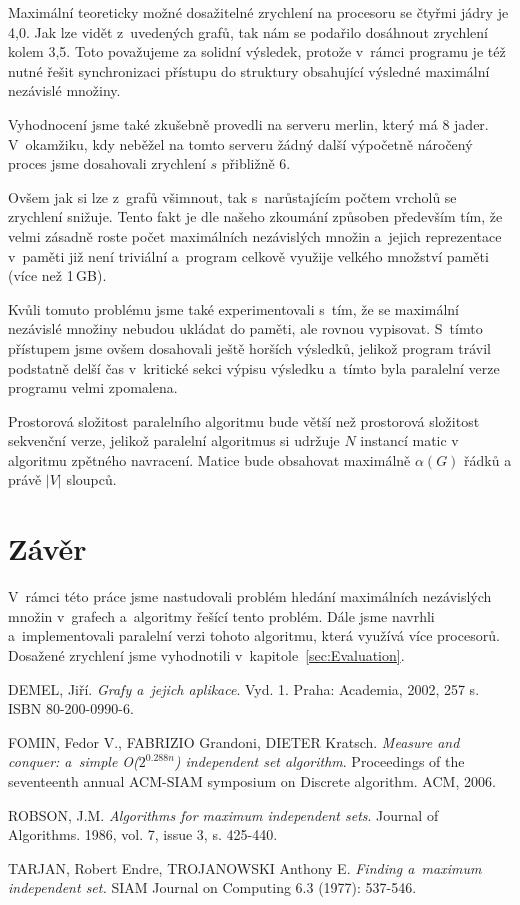 \documentclass[12pt]{article}
\begin{document}
Maximální teoreticky možné dosažitelné zrychlení na procesoru se čtyřmi jádry je 4,0. Jak lze vidět z~uvedených grafů, tak nám se podařilo dosáhnout zrychlení kolem 3,5. Toto považujeme za solidní výsledek, protože v~rámci programu je též nutné řešit synchronizaci přístupu do struktury obsahující výsledné maximální nezávislé množiny.

Vyhodnocení jsme také zkušebně provedli na serveru merlin, který má 8 jader. V~okamžiku, kdy neběžel na tomto serveru žádný další výpočetně náročený proces jsme dosahovali zrychlení $s$ přibližně 6.  

Ovšem jak si lze z~grafů všimnout, tak s~narůstajícím počtem vrcholů se zrychlení snižuje. Tento fakt je dle našeho zkoumání způsoben především tím, že velmi zásadně roste počet maximálních nezávislých množin a~jejich reprezentace v~paměti již není triviální a~program celkově využije velkého množství paměti (více než 1\,GB). 

Kvůli tomuto problému jsme také experimentovali s~tím, že se maximální nezávislé množiny nebudou ukládat do paměti, ale rovnou vypisovat. S~tímto přístupem jsme ovšem dosahovali ještě horších výsledků, jelikož program trávil podstatně delší čas v~kritické sekci výpisu výsledku a~tímto byla paralelní verze programu velmi zpomalena. 

Prostorová složitost paralelního algoritmu bude větší než prostorová složitost sekvenční verze, jelikož paralelní algoritmus si udržuje $N$ instancí matic v algoritmu zpětného navracení. Matice bude obsahovat maximálně $\alpha(G)$ řádků a právě $|V|$ sloupců.

\section{Závěr}
V~rámci této práce jsme nastudovali problém hledání maximálních nezávislých množin v~grafech a~algoritmy řešící tento problém. Dále jsme navrhli a~implementovali paralelní verzi tohoto algoritmu, která využívá více procesorů. Dosažené zrychlení jsme vyhodnotili v~kapitole~\ref{sec:Evaluation}.


\begin{thebibliography}{99}

    DEMEL, Jiří. \emph{Grafy a~jejich aplikace}. Vyd. 1. Praha: Academia, 2002, 257 s. ISBN 80-200-0990-6.

  FOMIN, Fedor V., FABRIZIO Grandoni, DIETER Kratsch.
  \emph{Measure and conquer: a~simple O($2^{0.288n}$) independent set algorithm}.
  Proceedings of the seventeenth annual ACM-SIAM symposium on Discrete algorithm.
   ACM, 2006.

ROBSON, J.M. \emph{Algorithms for maximum independent sets}. Journal of Algorithms. 1986, vol. 7, issue 3, s. 425-440.


  TARJAN, Robert Endre, TROJANOWSKI Anthony E.
  \emph{Finding a~maximum independent set.}
  SIAM Journal on Computing 6.3 (1977): 537-546.

\end{thebibliography}
\end{document}
